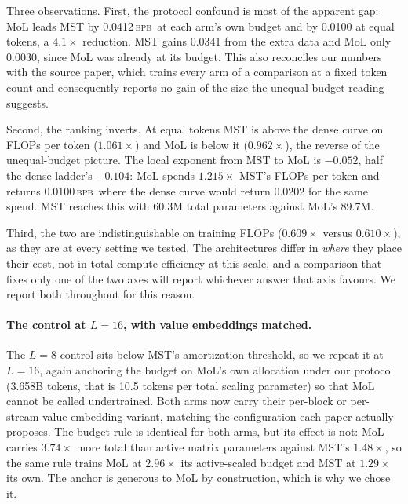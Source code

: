 \documentclass{article}
\newcommand{\bpb}{\textsc{bpb}}
\begin{document}
Three observations. First, the protocol confound is most of the apparent gap: MoL
leads MST by 0.0412\,\bpb\ at each arm's own budget and by 0.0100 at equal tokens,
a $4.1\times$ reduction. MST gains 0.0341 from the extra data and MoL only 0.0030,
since MoL was already at its budget. This also reconciles our numbers with the
source paper, which trains every arm of a comparison at a fixed token count and
consequently reports no gain of the size the unequal-budget reading suggests.

Second, the ranking inverts. At equal tokens MST is above the dense curve on
FLOPs per token ($1.061\times$) and MoL is below it ($0.962\times$), the reverse
of the unequal-budget picture. The local exponent from MST to MoL is $-0.052$,
half the dense ladder's $-0.104$: MoL spends $1.215\times$ MST's FLOPs per token
and returns 0.0100\,\bpb\ where the dense curve would return 0.0202 for the same
spend. MST reaches this with 60.3M total parameters against MoL's 89.7M.

Third, the two are indistinguishable on training FLOPs ($0.609\times$ versus
$0.610\times$), as they are at every setting we tested. The architectures differ
in \emph{where} they place their cost, not in total compute efficiency at this
scale, and a comparison that fixes only one of the two axes will report whichever
answer that axis favours. We report both throughout for this reason.

\paragraph{The control at $L{=}16$, with value embeddings matched.} The $L{=}8$
control sits below MST's amortization threshold, so we repeat it at $L{=}16$, again
anchoring the budget on MoL's own allocation under our protocol (3.658B tokens, that
is 10.5 tokens per total scaling parameter) so that MoL cannot be called
undertrained. Both arms now carry their per-block or per-stream value-embedding
variant, matching the configuration each paper actually proposes. The budget rule is
identical for both arms, but its effect is not: MoL carries $3.74\times$ more total
than active matrix parameters against MST's $1.48\times$, so the same rule trains
MoL at $2.96\times$ its active-scaled budget and MST at $1.29\times$ its own. The
anchor is generous to MoL by construction, which is why we chose it.
\end{document}
